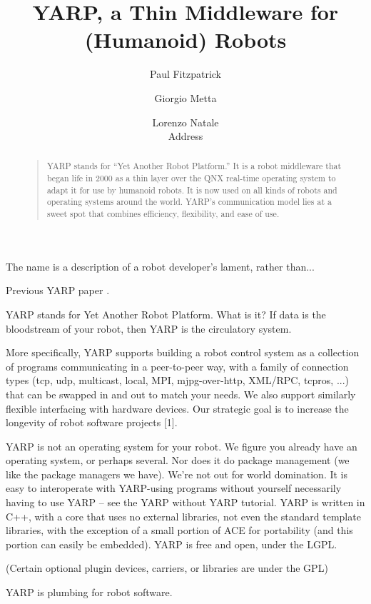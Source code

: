 \documentclass[letterpaper]{article}
\title{YARP, a Thin Middleware for (Humanoid) Robots}
\author{Paul Fitzpatrick \and Giorgio Metta \and Lorenzo Natale \\
Address}
\begin{document}
 
\maketitle
\begin{abstract}
\begin{quote}

YARP stands for ``Yet Another Robot Platform.''  It is a robot
middleware that began life in 2000 as a thin layer over the QNX
real-time operating system to adapt it for use by humanoid robots.  It
is now used on all kinds of robots and operating systems around the
world.  YARP's communication model lies at a sweet spot that combines
efficiency, flexibility, and ease of use.

\end{quote}
\end{abstract}

\noindent 

The name is
a description of a robot developer's lament, rather than...

Previous YARP paper \cite{fitzpatrick08towards}.

YARP stands for Yet Another Robot Platform. What is it? If data is the
bloodstream of your robot, then YARP is the circulatory system.

More specifically, YARP supports building a robot control system as a
collection of programs communicating in a peer-to-peer way, with a
family of connection types (tcp, udp, multicast, local, MPI,
mjpg-over-http, XML/RPC, tcpros, ...) that can be swapped in and out
to match your needs. We also support similarly flexible interfacing
with hardware devices. Our strategic goal is to increase the longevity
of robot software projects [1].

YARP is not an operating system for your robot. We figure you already
have an operating system, or perhaps several. Nor does it do package
management (we like the package managers we have). We're not out for
world domination. It is easy to interoperate with YARP-using programs
without yourself necessarily having to use YARP -- see the YARP
without YARP tutorial. YARP is written in C++, with a core that uses
no external libraries, not even the standard template libraries, with
the exception of a small portion of ACE for portability (and this
portion can easily be embedded). YARP is free and open, under the
LGPL.

(Certain optional plugin devices, carriers, or libraries are under the GPL)

YARP is plumbing for robot software.
\end{document}
